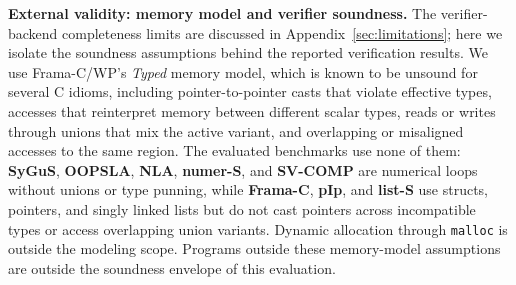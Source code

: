 \smallskip
\noindent\textbf{External validity: memory model and verifier soundness.}
The verifier-backend completeness limits are discussed in
Appendix~\ref{sec:limitations}; here we isolate the soundness assumptions behind
the reported verification results. We use Frama-C/WP's \emph{Typed} memory model,
which is known to be unsound for several C idioms, including pointer-to-pointer
casts that violate effective types, accesses that reinterpret memory between
different scalar types, reads or writes through unions that mix the active
variant, and overlapping or misaligned accesses to the same region. The evaluated
benchmarks use none of them: \textbf{SyGuS}, \textbf{OOPSLA}, \textbf{NLA},
\textbf{numer-S}, and \textbf{SV-COMP} are numerical loops without unions or type
punning, while \textbf{Frama-C}, \textbf{pIp}, and \textbf{list-S} use structs,
pointers, and singly linked lists but do not cast pointers across incompatible
types or access overlapping union variants. Dynamic allocation through
\texttt{malloc} is outside the modeling scope. Programs outside these memory-model
assumptions are outside the soundness envelope of this evaluation.
